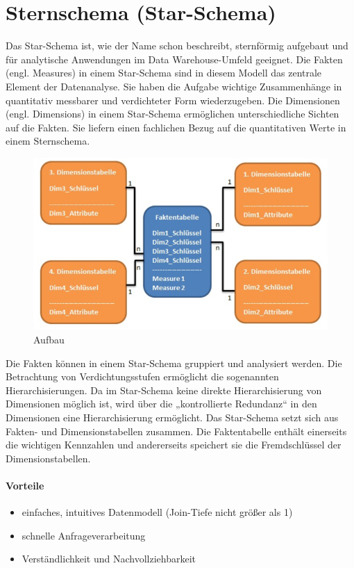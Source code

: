 \section{Sternschema (Star-Schema)}

Das Star-Schema ist, wie der Name schon beschreibt, sternförmig aufgebaut und für analytische Anwendungen im Data Warehouse-Umfeld geeignet.
Die Fakten (engl. Measures) in einem Star-Schema sind in diesem Modell das zentrale Element der Datenanalyse. Sie haben die Aufgabe wichtige Zusammenhänge in quantitativ messbarer und verdichteter Form wiederzugeben.
Die Dimensionen (engl. Dimensions) in einem Star-Schema ermöglichen unterschiedliche Sichten auf die Fakten. Sie liefern einen fachlichen Bezug auf die quantitativen Werte in einem Sternschema.

\begin{figure}[h]
    \centering
    \includegraphics[width=.8\textwidth]{Content/images/modellierung/star.png}
    \caption{Aufbau}
    \label{fig:modellierung:star}
\end{figure}

Die Fakten können in einem Star-Schema gruppiert und analysiert werden. Die Betrachtung von Verdichtungsstufen ermöglicht die sogenannten Hierarchisierungen. Da im Star-Schema keine direkte Hierarchisierung von Dimensionen möglich ist, wird über die „kontrollierte Redundanz“ in den Dimensionen eine Hierarchisierung ermöglicht.
Das Star-Schema setzt sich aus Fakten- und Dimensionstabellen zusammen. Die Faktentabelle enthält einerseits die wichtigen Kennzahlen und andererseits speichert sie die Fremdschlüssel der Dimensionstabellen.

\paragraph{Vorteile}
\begin{itemize}
    \item einfaches, intuitives Datenmodell (Join-Tiefe nicht größer als 1)
    \item schnelle Anfrageverarbeitung
    \item Verständlichkeit und Nachvollziehbarkeit
\end{itemize}

